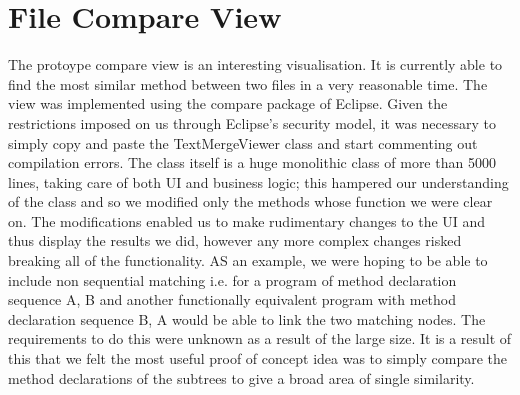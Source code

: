 \section{File Compare View}
The protoype compare view is an interesting visualisation. It is currently able
to find the most similar method between two files in a very reasonable time.
The view was implemented using the compare package of Eclipse.
Given the restrictions imposed on us through Eclipse's security model, it
was necessary to simply copy and paste the TextMergeViewer class and start
commenting out compilation errors. The class itself is a huge monolithic
class of more than 5000 lines, taking care of both UI and business logic;
this hampered our understanding of the class and so we modified only the 
methods whose function we were clear on. The modifications enabled us to
make rudimentary changes to the UI and thus display the results we did,
however any more complex changes risked breaking all of the functionality.
AS an example, we were hoping to be able to include non sequential matching
i.e. for a program of method declaration sequence A, B and another functionally
equivalent program with method declaration sequence B, A would be able to link
the two matching nodes. The requirements to do this were unknown as a result
of the large size. It is a result of this that we felt the most useful
proof of concept idea was to simply compare the method declarations of the
subtrees to give a broad area of single similarity.